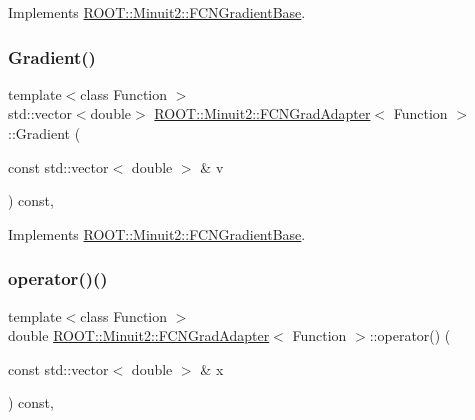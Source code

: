 Implements \mbox{\hyperlink{classROOT_1_1Minuit2_1_1FCNGradientBase_a004740e7e25a1358aafde6694196ef88}{R\+O\+O\+T\+::\+Minuit2\+::\+F\+C\+N\+Gradient\+Base}}.

\mbox{\label{classROOT_1_1Minuit2_1_1FCNGradAdapter_ae91d0453fd5e953f75551576659d6c7b}} 
\subsubsection{\texorpdfstring{Gradient()}{Gradient()}\hspace{0.1cm}{\footnotesize\ttfamily [3/3]}}
{\footnotesize\ttfamily template$<$class Function $>$ \\
std\+::vector$<$double$>$ \mbox{\hyperlink{classROOT_1_1Minuit2_1_1FCNGradAdapter}{R\+O\+O\+T\+::\+Minuit2\+::\+F\+C\+N\+Grad\+Adapter}}$<$ Function $>$\+::Gradient (\begin{DoxyParamCaption}\item[{const std\+::vector$<$ double $>$ \&}]{v }\end{DoxyParamCaption}) const\hspace{0.3cm}{\ttfamily [inline]}, {\ttfamily [virtual]}}



Implements \mbox{\hyperlink{classROOT_1_1Minuit2_1_1FCNGradientBase_a004740e7e25a1358aafde6694196ef88}{R\+O\+O\+T\+::\+Minuit2\+::\+F\+C\+N\+Gradient\+Base}}.

\mbox{\label{classROOT_1_1Minuit2_1_1FCNGradAdapter_a101e87d4c03ae367b24227b41bb258c4}} 
\subsubsection{\texorpdfstring{operator()()}{operator()()}\hspace{0.1cm}{\footnotesize\ttfamily [1/6]}}
{\footnotesize\ttfamily template$<$class Function $>$ \\
double \mbox{\hyperlink{classROOT_1_1Minuit2_1_1FCNGradAdapter}{R\+O\+O\+T\+::\+Minuit2\+::\+F\+C\+N\+Grad\+Adapter}}$<$ Function $>$\+::operator() (\begin{DoxyParamCaption}\item[{const std\+::vector$<$ double $>$ \&}]{x }\end{DoxyParamCaption}) const\hspace{0.3cm}{\ttfamily [inline]}, {\ttfamily [virtual]}}

